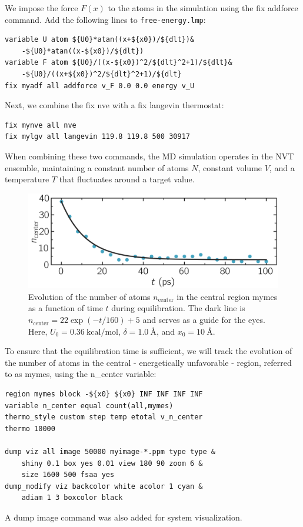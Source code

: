 \documentclass[9pt,tutorial]{livecoms}
\newcommand{\lmpcmd}[1]{\hspace{0pt}\colorbox{listing}{\textcolor{command}{\small{#1}}}\hspace{0pt}} %
\newcommand{\flecmd}[1]{\textcolor{command}{\texttt{#1}}} %
\begin{document}
We impose the force $F(x)$ to the atoms in the simulation
using the \lmpcmd{fix addforce} command.  Add the following
lines to \flecmd{free-energy.lmp}:
\begin{lstlisting}
variable U atom ${U0}*atan((x+${x0})/${dlt})&
    -${U0}*atan((x-${x0})/${dlt})
variable F atom ${U0}/((x-${x0})^2/${dlt}^2+1)/${dlt}&
    -${U0}/((x+${x0})^2/${dlt}^2+1)/${dlt}
fix myadf all addforce v_F 0.0 0.0 energy v_U
\end{lstlisting}
Next, we combine the \lmpcmd{fix nve} with a \lmpcmd{fix langevin} thermostat:
\begin{lstlisting}
fix mynve all nve
fix mylgv all langevin 119.8 119.8 500 30917
\end{lstlisting}
When combining these two commands, the MD simulation operates
in the NVT ensemble, maintaining a constant number of
atoms $N$, constant volume $V$, and a temperature $T$ that
fluctuates around a target value.

\begin{figure}
\centering
\includegraphics[width=\linewidth]{US-density-evolution}
\caption{Evolution of the number of atoms $n_\text{center}$ in the central
region \lmpcmd{mymes} as a function of time $t$ during equilibration.  The dark line
is $n_\text{center} = 22 \exp(-t/160)+5$ and serves as a guide for the eyes.
Here, $U_0 = 0.36~\text{kcal/mol}$, $\delta = 1.0~\text{\AA{}}$, and $x_0 = 10~\text{\AA{}}$.}
\label{fig:US-density-evolution}
\end{figure}

To ensure that the equilibration time is sufficient, we will track the evolution of
the number of atoms in the central - energetically unfavorable - region,
referred to as \lmpcmd{mymes}, using the \lmpcmd{n\_center} variable:
\begin{lstlisting}
region mymes block -${x0} ${x0} INF INF INF INF
variable n_center equal count(all,mymes)
thermo_style custom step temp etotal v_n_center
thermo 10000

dump viz all image 50000 myimage-*.ppm type type &
    shiny 0.1 box yes 0.01 view 180 90 zoom 6 &
    size 1600 500 fsaa yes
dump_modify viz backcolor white acolor 1 cyan &
    adiam 1 3 boxcolor black
\end{lstlisting}
A \lmpcmd{dump image} command was also added for system visualization.
\end{document}
